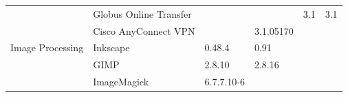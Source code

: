 \begin{table}[!ht]
{\begin{tabular}{|ll|l|l|l|l|}
\rowcolor{black!5}
\cellcolor{white}                                                      & \multicolumn{1}{|l|}{Globus Online Transfer} &                                                                     &                                                                   & 3.1                                                                    & 3.1                                            \\
\rowcolor{black!10}
\cellcolor{white}                                                      & \multicolumn{1}{|l|}{Cisco AnyConnect VPN}   &                                                                     & 3.1.05170                                                         &                                                                        &                                                \\
\hline
\rowcolor{black!5}
\cellcolor{white} Image Processing                                     & \multicolumn{1}{|l|}{Inkscape}               & 0.48.4                                                              & 0.91                                                              &                                                                        &                                                \\
\rowcolor{black!10}
\cellcolor{white}                                                      & \multicolumn{1}{|l|}{GIMP}                   & 2.8.10                                                              & 2.8.16                                                            &                                                                        &                                                \\
\rowcolor{black!5}
\cellcolor{white}                                                      & \multicolumn{1}{|l|}{ImageMagick}            & 6.7.7.10-6                                                          &                                                                   &                                                                        &                                                \\
\hline                                
\end{tabular}
}
\end{table}

\FloatBarrier

\setlength{\LTleft}{-20cm plus -1fill}
\setlength{\LTright}{\LTleft}

